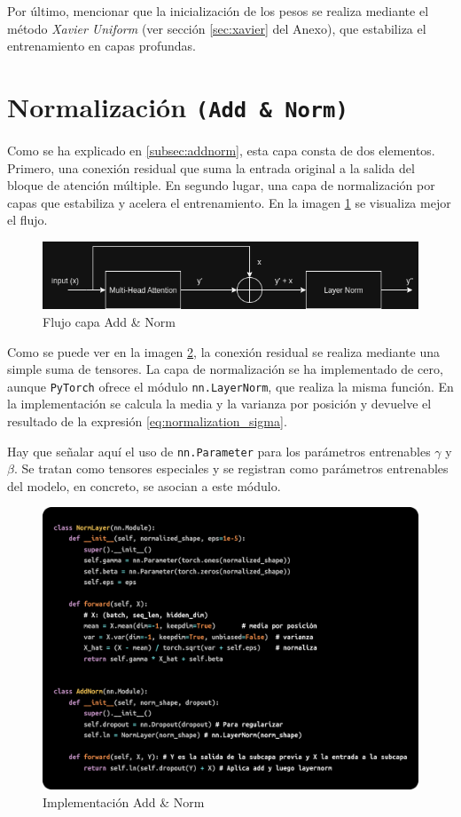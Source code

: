 \documentclass[11pt]{book}
\begin{document}
Por último, mencionar que la inicialización de los pesos se realiza mediante el método \textit{Xavier Uniform} (ver sección \ref{sec:xavier} del Anexo), que estabiliza el entrenamiento en capas profundas. 

\section{Normalización \texttt{(Add \& Norm)}}
Como se ha explicado en \ref{subsec:addnorm}, esta capa consta de dos elementos. Primero, una conexión residual que suma la entrada original a la salida del bloque de atención múltiple. En segundo lugar, una capa de normalización por capas que estabiliza y acelera el entrenamiento. En la imagen \ref{fig:placeholder14} se visualiza mejor el flujo.

\begin{figure}[h]
    \centering
    \includegraphics[width=0.5\linewidth]{img/esquema1.png}
    \caption{Flujo capa Add \& Norm}
    \label{fig:placeholder14}
\end{figure}

Como se puede ver en la imagen \ref{fig:placeholder26}, la conexión residual se realiza mediante una simple suma de tensores. La capa de normalización se ha implementado de cero, aunque \texttt{PyTorch} ofrece el módulo \texttt{nn.LayerNorm}, que realiza la misma función. En la implementación se calcula la media y la varianza por posición y devuelve el resultado de la expresión \eqref{eq:normalization_sigma}. 

Hay que señalar aquí el uso de \texttt{nn.Parameter} para los parámetros entrenables $\gamma$ y $\beta$. Se tratan como tensores especiales y se registran como parámetros entrenables del modelo, en concreto, se asocian a este módulo. 

\begin{figure}[h]
    \centering
    \includegraphics[width=0.5\linewidth]{img/add_norm.png}
    \caption{Implementación Add \& Norm}
    \label{fig:placeholder26}
\end{figure}
\end{document}
